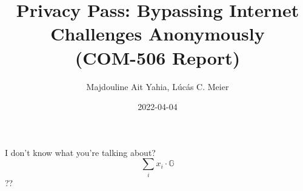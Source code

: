 \documentclass[12pt, a4paper]{article}
\date{2022-04-04}
\title{Privacy Pass: Bypassing Internet Challenges Anonymously\\
\large (COM-506 Report)
}
\author{Majdouline Ait Yahia, Lúcás C. Meier}
\begin{document}
\maketitle

I don't know what you're talking about?
$$
\sum_i x_i \cdot \mathbb{G}
$$
\newpage
??
\end{document}

